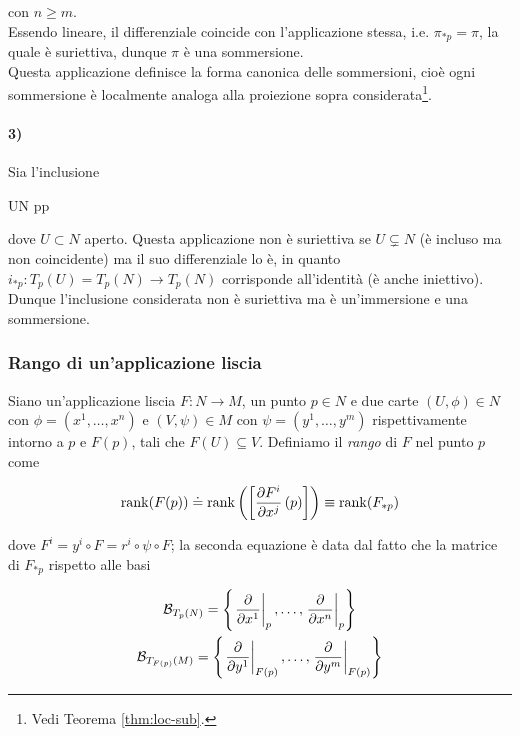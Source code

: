con $ n \geqslant m $.\\
Essendo lineare, il differenziale coincide con l'applicazione stessa, i.e. $ \pi_{*p} = \pi $, la quale è suriettiva, dunque $ \pi $ è una sommersione.\\
Questa applicazione definisce la forma canonica delle sommersioni, cioè ogni sommersione è localmente analoga alla proiezione sopra considerata\footnote{%
	Vedi Teorema \ref{thm:loc-sub}.%
}.

\paragraph{3)}

Sia l'inclusione

	{U}{N}
	{p}{p}

dove $ U \subset N $ aperto. Questa applicazione non è suriettiva se $ U \subsetneq N $ (è incluso ma non coincidente) ma il suo differenziale lo è, in quanto $ i_{*p} : T_{p}(U) = T_{p}(N) \to T_{p}(N) $ corrisponde all'identità (è anche iniettivo).\\
Dunque l'inclusione considerata non è suriettiva ma è un'immersione e una sommersione.

\subsubsection{Rango di un'applicazione liscia}

Siano un'applicazione liscia $ F : N \to M $, un punto $ p \in N $ e due carte $ (U,\phi) \in N $ con $ \phi = (x^{1},\dots,x^{n}) $ e $ (V,\psi) \in M $ con $ \psi = (y^{1},\dots,y^{m}) $ rispettivamente intorno a $ p $ e $ F(p) $, tali che $ F(U) \subseteq V $. Definiamo il \textit{rango} di $ F $ nel punto $ p $ come

\begin{equation}
	\rank(F(p)) \doteq \rank\left( \left[ \pdv{F^{i}}{x^{j}} \, (p) \right] \right) %
	\equiv \rank(F_{*p})
\end{equation}

dove $ F^{i} = y^{i} \circ F = r^{i} \circ \psi \circ F $; la seconda equazione è data dal fatto che la matrice di $ F_{*p} $ rispetto alle basi

\begin{gather}
	\mathcal{B}_{T_{p}(N)} = \left\{ \eval{ \pdv{x^{1}} }_{p}, \dots, \eval{ \pdv{x^{n}} }_{p} \right\}\\
	\mathcal{B}_{T_{F(p)}(M)} = \left\{ \eval{ \pdv{y^{1}} }_{F(p)}, \dots, \eval{ \pdv{y^{m}} }_{F(p)} \right\}
\end{gather}

